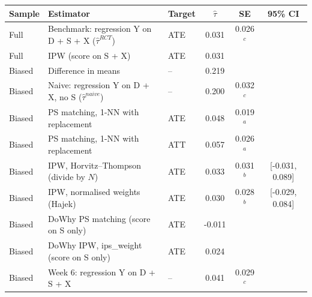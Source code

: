 \begin{tabular}{lllccc}
\toprule
Sample & Estimator & Target & $\hat\tau$ & SE & 95\% CI\\
\midrule
Full & Benchmark: regression Y on D + S + X ($\hat\tau^{RCT}$) & ATE & 0.031 & 0.026$^c$ & \\
Full & IPW (score on S + X) & ATE & 0.031 &  & \\
\addlinespace
Biased & Difference in means & -- & 0.219 &  & \\
Biased & Naive: regression Y on D + X, no S ($\hat\tau^{naive}$) & -- & 0.200 & 0.032$^c$ & \\
\addlinespace
Biased & PS matching, 1-NN with replacement & ATE & 0.048 & 0.019$^a$ & \\
Biased & PS matching, 1-NN with replacement & ATT & 0.057 & 0.026$^a$ & \\
Biased & IPW, Horvitz--Thompson (divide by $N$) & ATE & 0.033 & 0.031$^b$ & [-0.031, 0.089]\\
Biased & IPW, normalised weights (Hajek) & ATE & 0.030 & 0.028$^b$ & [-0.029, 0.084]\\
\addlinespace
Biased & DoWhy PS matching (score on S only) & ATE & -0.011 &  & \\
Biased & DoWhy IPW, ips\_weight (score on S only) & ATE & 0.024 &  & \\
Biased & Week 6: regression Y on D + S + X & -- & 0.041 & 0.029$^c$ & \\
\bottomrule
\end{tabular}
